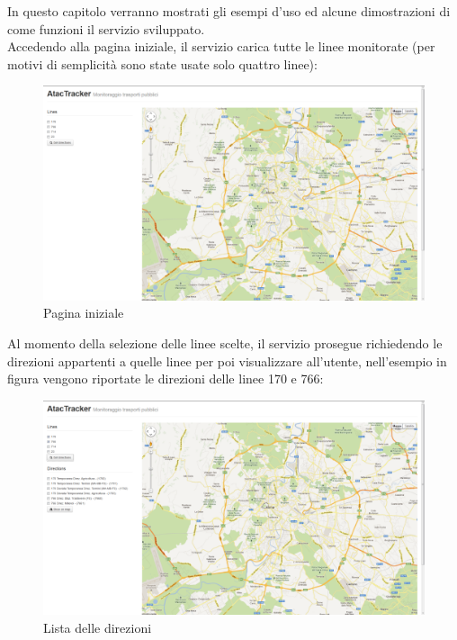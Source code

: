 In questo capitolo verranno mostrati gli esempi d'uso ed alcune dimostrazioni di come funzioni il servizio sviluppato.\\

Accedendo alla pagina iniziale, il servizio carica tutte le linee monitorate (per motivi di semplicità sono state usate solo quattro linee):
\vspace{1cm}
\begin{figure}[htbp]
\begin{center}
\includegraphics[width=12cm]{contents/images/home}
\end{center}
\caption{Pagina iniziale}
\label{fig:home}
\end{figure}

\newpage
Al momento della selezione delle linee scelte, il servizio prosegue richiedendo le direzioni appartenti a quelle linee per poi visualizzare all'utente, nell'esempio in figura vengono riportate le direzioni delle linee 170 e 766:

\begin{figure}[htbp]
\begin{center}
\includegraphics[width=12cm]{contents/images/directions}
\end{center}
\caption{Lista delle direzioni}
\label{fig:directions}
\end{figure}

